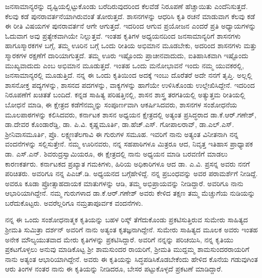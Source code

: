 ಜನಸಾಮಾನ್ಯರನ್ನು ದೃಷ್ಟಿಯಲ್ಲಿಟ್ಟುಕೊಂಡು ಬರೆದಿರುವುದರಿಂದ ಕೆಲವೆಡೆ ನಿರೂಪಣೆ ಹೆಚ್ಚಾಯಿತು ಎಂದೆನಿಸು\-ತ್ತದೆ. ಕೆಲವು ಕಡೆ ಪುನರಾವರ್ತನೆಯಾಗಿರುವಂತೆ ತೋರುತ್ತದೆ. ಶಾಸನಗಳನ್ನು ಆಧರಿಸಿ ಕೃತಿ ರಚನೆ ಮಾಡುವಾಗ ಕೆಲವು ಕಡೆ ಈ ರೀತಿ ವಿಷಯಗಳ ಪುನರಾವರ್ತನೆ ಆಗೇ ಆಗುತ್ತದೆ. ಇದರಿಂದ ಆಗುವ ಪ್ರಯೋಜನ ಎಂದರೆ ಪ್ರತಿ ಅಧ್ಯಾಯಗಳನ್ನು ಓದುವಾಗ ಅವು ಪ್ರತ್ಯೇಕವಾಗಿಯೇ ನಿಲ್ಲುತ್ತವೆ. ಇಂತಹ ಕೃತಿಗಳ ಅಧ್ಯಯನದಿಂದ ಜನಸಾಮಾನ್ಯರಿಗೆ ಶಾಸನಗಳು ಹಾಗೂ\break ಸ್ಮಾರಕಗಳ ಬಗ್ಗೆ, ತಮ್ಮ ಊರಿನ ಬಗ್ಗೆ ಒಂದು ರೀತಿಯ ಅಭಿಮಾನ ಮೂಡಬೇಕು, ಅದರಿಂದ ಶಾಸನಗಳು ಮತ್ತು ಸ್ಮಾರಕಗಳ ರಕ್ಷಣೆಗೆ ದಾರಿಯಾಗುತ್ತದೆ. ತಮ್ಮ ಊರು ಇಷ್ಟೊಂದು ಪ್ರಾಚೀನವಾದುದು, ಐತಿಹಾಸಿಕವಾಗಿ ಇಷ್ಟೊಂದು ಮುಖ್ಯವಾದುದು ಎಂಬ ಅಭಿಮಾನ ಮೂಡುತ್ತದೆ. ಇಂತಹ ಒಂದು ಮನೋಭಾವನೆ ಇಂದು ನಮ್ಮ ಯುವಕರಲ್ಲಿ, ಜನಸಾಮಾನ್ಯರಲ್ಲಿ ಮೂಡು\-ತ್ತಿದೆ. ನನ್ನ ಈ ಒಂದು ಕೃತಿಯಿಂದ ಅದಕ್ಕೆ ಇಂಬು ದೊರೆತರೆ ಅದೇ ನನಗೆ ತೃಪ್ತಿ. ಅಲ್ಲಲ್ಲಿ ಶಾಸನೋಕ್ತ ಪದ್ಯಗಳನ್ನು, ಶಾಸನದ ಪದಗಳನ್ನು, ವಾಕ್ಯಗಳನ್ನು ಹಾಗೆಯೇ ಉಳಿಸಿಕೊಂಡು ಉಲ್ಲೇಖಿಸಿದ್ದೇನೆ. ಇದರಿಂದ ನಿರೂಪಣೆಗೆ ಖಚಿತತೆ ಬಂದಿದೆ. ಕನ್ನಡ ಸಾಹಿತ್ಯ ಪರಿಷತ್ತಿನಲ್ಲಿ, ಶಾಸನ ಶಾಸ್ತ್ರ ತರಗತಿಯಲ್ಲಿ ಅತ್ಯುತ್ತಮ ರೀತಿಯಲ್ಲಿ ಬೋಧನೆ ಮಾಡಿ, ಈ ಕ್ಷೇತ್ರದ ಕಡೆಗೆ\break ನಮ್ಮನ್ನು ಸಂಪೂರ್ಣವಾಗಿ ಆಕರ್ಷಿಸಿದವರು, ಶಾಸನಗಳ ಸಂಶೋಧನೆಯ ಮೂಲಪಾಠಗಳನ್ನು ಕಲಿಸಿದವರು, ಕರ್ನಾಟಕ ಶಾಸನ ಅಧ್ಯಯನ ಕ್ಷೇತ್ರದಲ್ಲಿ ಅತ್ಯಂತ ಪ್ರಸಿದ್ಧರಾದ ಡಾ.ಕೆ.ಆರ್​.ಗಣೇಶ್​, ಡಾ.ದೇವರ ಕೊಂಡಾರೆಡ್ಡಿ, ಡಾ. ಪಿ.ವಿ. ಕೃಷ್ಣಮೂರ್ತಿ, ಡಾ.ಹೆಚ್​.ಎಸ್​. ಗೋಪಾಲರಾವ್​, ಡಾ.ಎಲ್​.ಎಸ್​. ಶ‍್ರೀನಿವಾಸಮೂರ್ತಿ, ಪ್ರೊ. ಲಕ್ಷ್ಮಣತೆಲಗಾವಿ ಈ ಗುರುಗಳ ಸಮೂಹ. ಇವರಿಗೆ ನಾನು ಅತ್ಯಂತ ವಿನೀತನಾಗಿ ನನ್ನ ವಂದನೆಗಳನ್ನು ಸಲ್ಲಿಸುತ್ತೇನೆ. ನಮ್ಮ ಊರಿನವರು, ನನ್ನ ಸಹಪಾಠಿಗಳೂ ಮಿತ್ರರೂ ಆದ, ನಿವೃತ್ತ ಇತಿಹಾಸ ಪ್ರಾಧ್ಯಾಪಕ ಡಾ. ಎಸ್​.ಎನ್​. ಶಿವರುದ್ರಸ್ವಾಮಿಯರೂ, ಈ ಕ್ಷೇತ್ರದಲ್ಲಿ ನಾನು ಅಧ್ಯಯನ ಮಾಡಿ ಬರವಣಿಗೆ ಮಾಡಲು ಕಾರಣಕರ್ತರು. ಕರ್ನಾಟಕದ ಪ್ರಖ್ಯಾತ ಗಮಕಿಗಳು, ಹಿರಿಯ ಅಧಿಕಾರಿಗಳೂ ಆದ ಡಾ. ಎ.ವಿ. ಪ್ರಸನ್ನ ಅವರು ನನಗೆ ಪರಿಚಿತರು. ಅವರಿಗೂ ನನ್ನ ಪಿಎಚ್​.ಡಿ. ಅಧ್ಯಯನದ ಬಗ್ಗೆ\break ಹೇಳಿದ್ದೆ. ನನ್ನ ಪ್ರಬಂಧವನ್ನು ಅವರ ಪರಾಮರ್ಶೆಗೆ ನೀಡಿದ್ದೆ. ಅವರೂ ಕೂಡಾ ಪ್ರೋತ್ಸಾಹದಾಯಕ ಮಾತುಗಳನ್ನು ಆಡಿ, ತಮ್ಮ ಅಭಿಪ್ರಾಯವನ್ನು ನೀಡಿದ್ದಾರೆ. ಅವರಿಗೂ ನಾನು ಆಭಾರಿಯಾಗಿದ್ದೇನೆ. ನಮ್ಮ ಗುರುಗಳಾದ ಡಾ.ಕೆ.ಆರ್​.ಗಣೇಶ್​ ಅವರು ಕೇಳಿದ ತಕ್ಷಣ ತಮ್ಮ ಮೆಚ್ಚುಗೆಯ ನುಡಿಯನ್ನು ಬರೆದು\-ಕೊಟ್ಟರು. ಅವರೆಲ್ಲರಿಗೂ ನಮ್ರತಾಪೂರ್ವಕ ವಂದನೆಗಳು.

ನನ್ನ ಈ ಒಂದು ಸಂಶೋಧನಾತ್ಮಕ ಕೃತಿಯನ್ನು ಬಹಳ ರಿಸ್ಕ್​ ತೆಗೆದುಕೊಂಡು ಪ್ರಕಟಿಸುತ್ತಿರುವ ಸುಮೇರು ಸಾಹಿತ್ಯದ ಶ‍್ರೀಮತಿ ಸುಮಿತ್ರಾ ದರ್ಶನ್​ ಅವರಿಗೆ ನಾನು ಅತ್ಯಂತ ಕೃತಜ್ಞನಾಗಿದ್ದೇನೆ. ಸುಮೇರು ಸಾಹಿತ್ಯದ ಮೂಲಕ ಅವರು ಇಂತಹ ಅನೇಕ ಮೌಲ್ಯಯುತವಾದ ಮೇರು ಕೃತಿಗಳನ್ನು ಪ್ರಕಟಿಸಿದ್ದಾರೆ. ಅವರಿಗೆ ನನ್ನನ್ನು ಪರಿಚಯಿಸಿ, ನನ್ನ ಕೃತಿಯು ಪ್ರಕಟಗೊಳ್ಳಲು ಅನುವು ಮಾಡಿಕೊಟ್ಟ ಶ‍್ರೀ ಶಾಮಸುಂದರ ರಾಯರಿಗೆ, ಶ‍್ರೀಮತಿ ಮುದ್ದಮ್ಮ ಶಾಮಸುಂದರರಾಯರಿಗೆ ನಾನು ಅತ್ಯಂತ ಆಭಾರಿಯಾಗಿದ್ದೇನೆ. ಅವರು ಈ ಕೃತಿಯನ್ನು ಸಿದ್ಧಪಡಿಸಿಕೊಡಬೇಕೆಂದು ಹೇಳಿದ ಕೊನೆಯ ಗಡುವುಗಿಂತ ಆರು ತಿಂಗಳ ನಂತರ ನಾನು ಈ ಕೃತಿಯನ್ನು ನೀಡಿದರೂ, ಬೇಸರ ಪಟ್ಟುಕೊಳ್ಳದೆ ಪ್ರಕಟಣೆ ಮಾಡಿದ್ದಾರೆ.

